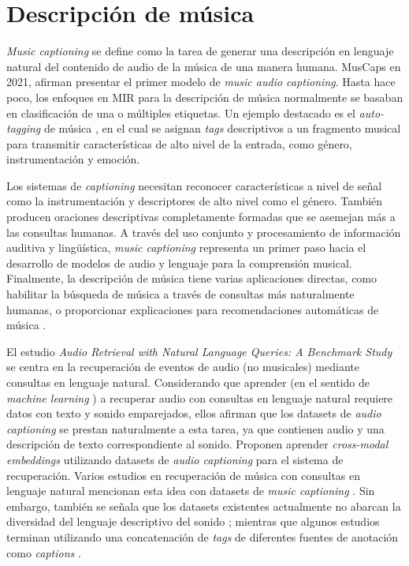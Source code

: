 \section{Descripción de música}
\label{sec:music_captioning}

\textit{Music captioning} se define como la tarea de generar una descripción en lenguaje natural del contenido de audio de la música de una manera humana.
MusCaps \cite{Manco2021MusCapsGC} en 2021, afirman presentar el primer modelo de \textit{music audio captioning}. Hasta hace poco, los enfoques en MIR para la descripción de música normalmente se basaban en clasificación de una o múltiples etiquetas. Un ejemplo destacado es el \textit{auto-tagging} de música \cite{Choi2016AutomaticTU, Lee2017SamplelevelDC, Pons2017EndtoendLF}, en el cual se asignan \textit{tags} descriptivos a un fragmento musical para transmitir características de alto nivel de la entrada, como género, instrumentación y emoción.

Los sistemas de \textit{captioning} necesitan reconocer características a nivel de señal como la instrumentación y descriptores de alto nivel como el género. También producen oraciones descriptivas completamente formadas que se asemejan más a las consultas humanas. A través del uso conjunto y procesamiento de información auditiva y lingüística, \textit{music captioning} representa un primer paso hacia el desarrollo de modelos de audio y lenguaje para la comprensión musical. Finalmente, la descripción de música tiene varias aplicaciones directas, como habilitar la búsqueda de música a través de consultas más naturalmente humanas, o proporcionar explicaciones para recomendaciones automáticas de música \cite{Manco2021MusCapsGC}.

El estudio \textit{Audio Retrieval with Natural Language Queries: A Benchmark Study} \cite{Koepke2021AudioRW} se centra en la recuperación de eventos de audio (no musicales) mediante consultas en lenguaje natural. Considerando que aprender (en el sentido de  \textit{machine learning} ) a recuperar audio con consultas en lenguaje natural requiere datos con texto y sonido emparejados, ellos \cite{Koepke2021AudioRW} afirman que los datasets de \textit{audio captioning} se prestan naturalmente a esta tarea, ya que contienen audio y una descripción de texto correspondiente al sonido. Proponen aprender \textit{cross-modal embeddings} utilizando datasets de \textit{audio captioning} para el sistema de recuperación. Varios estudios en recuperación de música con consultas en lenguaje natural mencionan esta idea con datasets de \textit{music captioning} \cite{Doh2022TowardUT, Manco2022ContrastiveAL, Huang2022MuLanAJ}. Sin embargo, también se señala que los datasets existentes actualmente no abarcan la diversidad del lenguaje descriptivo del sonido \cite{Huang2022MuLanAJ}; mientras que algunos estudios terminan utilizando una concatenación de \textit{tags} de diferentes fuentes de anotación como \textit{captions} \cite{Doh2022TowardUT}.

